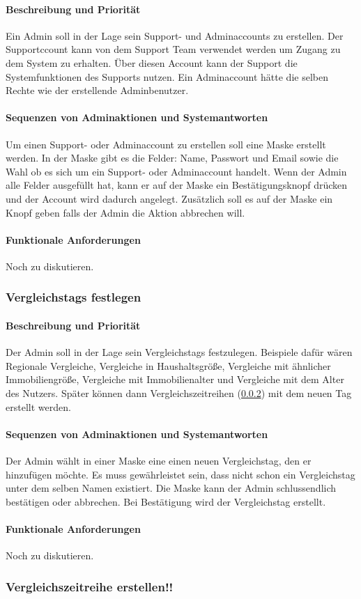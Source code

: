 \paragraph{Beschreibung und Priorität}
Ein Admin soll in der Lage sein Support- und Adminaccounts zu erstellen. Der Supportccount kann von dem Support Team verwendet werden um Zugang zu dem System zu erhalten. Über diesen Account kann der Support die Systemfunktionen des Supports nutzen. Ein Adminaccount hätte die selben Rechte wie der erstellende Adminbenutzer.
\paragraph{Sequenzen von Adminaktionen und Systemantworten}
Um einen Support- oder Adminaccount zu erstellen soll eine Maske erstellt werden. In der Maske gibt es die Felder: Name, Passwort und Email sowie die Wahl ob es sich um ein Support- oder Adminaccount handelt. Wenn der Admin alle Felder ausgefüllt hat, kann er auf der Maske ein Bestätigungsknopf drücken und der Account wird dadurch angelegt. Zusätzlich soll es auf der Maske ein  Knopf geben falls der Admin die Aktion abbrechen will.
\paragraph{Funktionale Anforderungen}
Noch zu diskutieren.

\subsubsection{Vergleichstags festlegen}\label{sec:vergl_tags}
\paragraph{Beschreibung und Priorität}
Der Admin soll in der Lage sein Vergleichstags festzulegen. Beispiele dafür wären Regionale Vergleiche, Vergleiche in Haushaltsgröße, Vergleiche mit ähnlicher Immobiliengröße, Vergleiche mit Immobilienalter und Vergleiche mit dem Alter des Nutzers. Später können dann Vergleichszeitreihen (\ref{sec:vergl_zeitr}) mit dem neuen Tag erstellt werden.
\paragraph{Sequenzen von Adminaktionen und Systemantworten}
Der Admin wählt in einer Maske eine einen neuen Vergleichstag, den er hinzufügen möchte. Es muss gewährleistet sein, dass nicht schon ein Vergleichstag unter dem selben Namen existiert. Die Maske kann der Admin schlussendlich bestätigen oder abbrechen. Bei Bestätigung wird der Vergleichstag erstellt.
\paragraph{Funktionale Anforderungen}
Noch zu diskutieren.


\subsubsection{Vergleichszeitreihe erstellen!!}\label{sec:vergl_zeitr}
